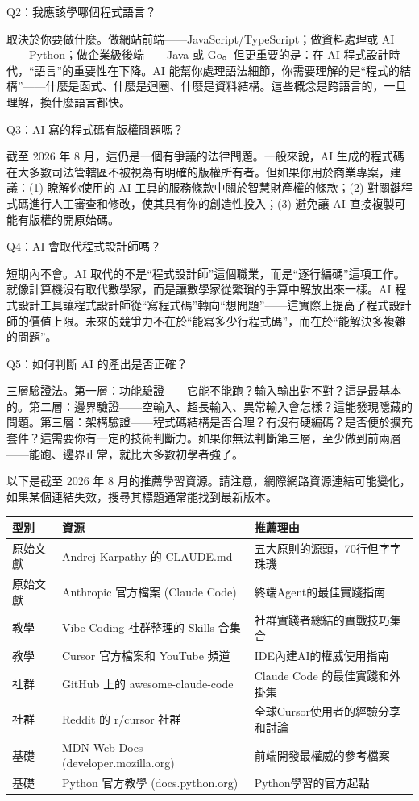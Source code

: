 Q2：我應該學哪個程式語言？

取決於你要做什麼。做網站前端——JavaScript/TypeScript；做資料處理或 AI——Python；做企業級後端——Java 或 Go。但更重要的是：在 AI 程式設計時代，“語言”的重要性在下降。AI 能幫你處理語法細節，你需要理解的是“程式的結構”——什麼是函式、什麼是迴圈、什麼是資料結構。這些概念是跨語言的，一旦理解，換什麼語言都快。

Q3：AI 寫的程式碼有版權問題嗎？

截至 2026 年 8 月，這仍是一個有爭議的法律問題。一般來說，AI 生成的程式碼在大多數司法管轄區不被視為有明確的版權所有者。但如果你用於商業專案，建議：(1) 瞭解你使用的 AI 工具的服務條款中關於智慧財產權的條款；(2) 對關鍵程式碼進行人工審查和修改，使其具有你的創造性投入；(3) 避免讓 AI 直接複製可能有版權的開原始碼。

Q4：AI 會取代程式設計師嗎？

短期內不會。AI 取代的不是“程式設計師”這個職業，而是“逐行編碼”這項工作。就像計算機沒有取代數學家，而是讓數學家從繁瑣的手算中解放出來一樣。AI 程式設計工具讓程式設計師從“寫程式碼”轉向“想問題”——這實際上提高了程式設計師的價值上限。未來的競爭力不在於“能寫多少行程式碼”，而在於“能解決多複雜的問題”。

Q5：如何判斷 AI 的產出是否正確？

三層驗證法。第一層：功能驗證——它能不能跑？輸入輸出對不對？這是最基本的。第二層：邊界驗證——空輸入、超長輸入、異常輸入會怎樣？這能發現隱藏的問題。第三層：架構驗證——程式碼結構是否合理？有沒有硬編碼？是否便於擴充套件？這需要你有一定的技術判斷力。如果你無法判斷第三層，至少做到前兩層——能跑、邊界正常，就比大多數初學者強了。


以下是截至 2026 年 8 月的推薦學習資源。請注意，網際網路資源連結可能變化，如果某個連結失效，搜尋其標題通常能找到最新版本。

\begin{center}
\begin{tabularx}{\linewidth}{|X|X|X|}
\hline
\textbf{型別} & \textbf{資源} & \textbf{推薦理由} \tabularnewline
\hline
原始文獻 & Andrej Karpathy 的 CLAUDE.md & 五大原則的源頭，70行但字字珠璣 \tabularnewline
原始文獻 & Anthropic 官方檔案 (Claude Code) & 終端Agent的最佳實踐指南 \tabularnewline
教學 & Vibe Coding 社群整理的 Skills 合集 & 社群實踐者總結的實戰技巧集合 \tabularnewline
教學 & Cursor 官方檔案和 YouTube 頻道 & IDE內建AI的權威使用指南 \tabularnewline
社群 & GitHub 上的 awesome-claude-code & Claude Code 的最佳實踐和外掛集 \tabularnewline
社群 & Reddit 的 r/cursor 社群 & 全球Cursor使用者的經驗分享和討論 \tabularnewline
基礎 & MDN Web Docs (developer.mozilla.org) & 前端開發最權威的參考檔案 \tabularnewline
基礎 & Python 官方教學 (docs.python.org) & Python學習的官方起點 \tabularnewline
\hline
\end{tabularx}
\end{center}


